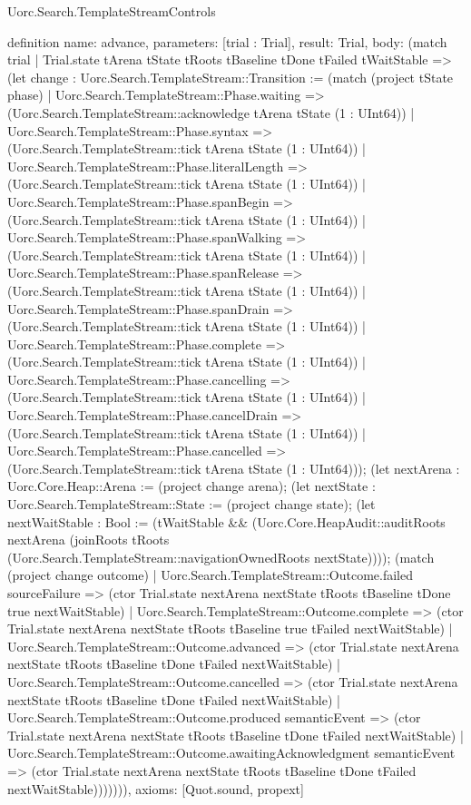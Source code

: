 \begin{lexlean}{Uorc.Search.TemplateStreamControls}
\begin{semanticmodule}
definition{
  name: advance,
  parameters: [trial : Trial],
  result: Trial,
  body: (match trial
    | Trial.state tArena tState tRoots tBaseline tDone tFailed tWaitStable => (let change : Uorc.Search.TemplateStream::Transition := (match (project tState phase)
      | Uorc.Search.TemplateStream::Phase.waiting => (Uorc.Search.TemplateStream::acknowledge tArena tState (1 : UInt64))
      | Uorc.Search.TemplateStream::Phase.syntax => (Uorc.Search.TemplateStream::tick tArena tState (1 : UInt64))
      | Uorc.Search.TemplateStream::Phase.literalLength => (Uorc.Search.TemplateStream::tick tArena tState (1 : UInt64))
      | Uorc.Search.TemplateStream::Phase.spanBegin => (Uorc.Search.TemplateStream::tick tArena tState (1 : UInt64))
      | Uorc.Search.TemplateStream::Phase.spanWalking => (Uorc.Search.TemplateStream::tick tArena tState (1 : UInt64))
      | Uorc.Search.TemplateStream::Phase.spanRelease => (Uorc.Search.TemplateStream::tick tArena tState (1 : UInt64))
      | Uorc.Search.TemplateStream::Phase.spanDrain => (Uorc.Search.TemplateStream::tick tArena tState (1 : UInt64))
      | Uorc.Search.TemplateStream::Phase.complete => (Uorc.Search.TemplateStream::tick tArena tState (1 : UInt64))
      | Uorc.Search.TemplateStream::Phase.cancelling => (Uorc.Search.TemplateStream::tick tArena tState (1 : UInt64))
      | Uorc.Search.TemplateStream::Phase.cancelDrain => (Uorc.Search.TemplateStream::tick tArena tState (1 : UInt64))
      | Uorc.Search.TemplateStream::Phase.cancelled => (Uorc.Search.TemplateStream::tick tArena tState (1 : UInt64))); (let nextArena : Uorc.Core.Heap::Arena := (project change arena); (let nextState : Uorc.Search.TemplateStream::State := (project change state); (let nextWaitStable : Bool := (tWaitStable && (Uorc.Core.HeapAudit::auditRoots nextArena (joinRoots tRoots (Uorc.Search.TemplateStream::navigationOwnedRoots nextState)))); (match (project change outcome)
      | Uorc.Search.TemplateStream::Outcome.failed sourceFailure => (ctor Trial.state nextArena nextState tRoots tBaseline tDone true nextWaitStable)
      | Uorc.Search.TemplateStream::Outcome.complete => (ctor Trial.state nextArena nextState tRoots tBaseline true tFailed nextWaitStable)
      | Uorc.Search.TemplateStream::Outcome.advanced => (ctor Trial.state nextArena nextState tRoots tBaseline tDone tFailed nextWaitStable)
      | Uorc.Search.TemplateStream::Outcome.cancelled => (ctor Trial.state nextArena nextState tRoots tBaseline tDone tFailed nextWaitStable)
      | Uorc.Search.TemplateStream::Outcome.produced semanticEvent => (ctor Trial.state nextArena nextState tRoots tBaseline tDone tFailed nextWaitStable)
      | Uorc.Search.TemplateStream::Outcome.awaitingAcknowledgment semanticEvent => (ctor Trial.state nextArena nextState tRoots tBaseline tDone tFailed nextWaitStable))))))),
  axioms: [Quot.sound, propext]
}


\end{semanticmodule}
\end{lexlean}
